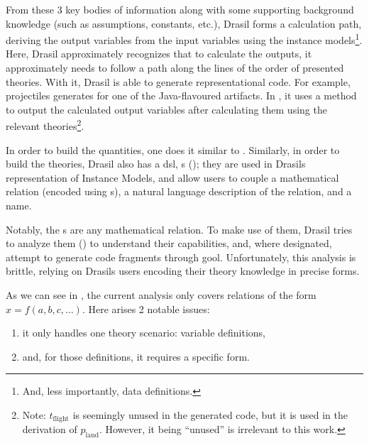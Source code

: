 From these 3 key bodies of information along with some supporting background
knowledge (such as assumptions, constants, etc.), Drasil forms a calculation
path, deriving the output variables from the input variables using the instance
models\footnote{And, less importantly, data definitions.}. Here, Drasil
approximately recognizes that to calculate the outputs, it approximately needs
to follow a path along the lines of the order of presented theories. With it,
Drasil is able to generate representational code. For example, \acsp{projectile}
generates  for one of the Java-flavoured
artifacts. In , it uses a
 method to output the calculated output variables
after calculating them using the relevant theories\footnote{Note:
\(t_\text{flight}\) is seemingly unused in the generated code, but it is used in
the derivation of \(p_\text{land}\). However, it being ``unused'' is irrelevant
to this work.}.

\originalJavaProjectileMain{}

In order to build the quantities, one does it similar to
. Similarly, in order to build the
theories, Drasil also has a \acs{dsl}, \RelationConcept{}s
(); they are used in Drasils representation of
Instance Models, and allow users to couple a mathematical relation (encoded
using \Relation{}s), a natural language description of the relation, and a name.

\originalRelationConcept{}

Notably, the \Relation{}s are any mathematical relation. To make use of them,
Drasil tries to analyze them () to understand their
capabilities, and, where designated, attempt to generate code fragments through
\acs{gool}. Unfortunately, this analysis is brittle, relying on Drasils users
encoding their theory knowledge in precise forms.

\originalRelToQDHaskell{}

As we can see in , the current analysis only covers
relations of the form \(x = f(a, b, c, \ldots{})\). Here arises 2 notable
issues:
\begin{enumerate}
    \item[\namedlabel{mk:issue:1}{Issue 1}] it only handles one theory scenario:
    variable definitions,
    \item[\namedlabel{mk:issue:2}{Issue 2}] and, for those definitions, it
    requires a specific form.
\end{enumerate}

